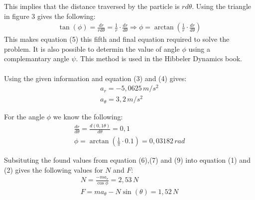 \documentclass[11pt, a4paper]{article}
\begin{document}
This implies that the distance traversed by the particle is $rd\theta$. Using the triangle in 
figure 3 gives the following:
\begin{gather}
    \tan(\phi) = \frac{dr}{rd\theta} = \frac{1}{r} \cdot \frac{dr}{d\theta} \Rightarrow
    \phi = \arctan \left( \frac{1}{r} \cdot \frac{dr}{d\theta} \right)
\end{gather}
This makes equation (5) this fifth and final equation required to solve the problem. It is also possible to
determin the value of angle $\phi$ using a complemantary angle $\psi$. This method is used in the Hibbeler Dynamics book.\\
\\
Using the given information and equation (3) and (4) gives:
\begin{gather}
    a_r = -5,0625\,m/s^2\\
    a_\theta = 3,2\,m/s^2
\end{gather}

For the angle $\phi$ we know the following:
\begin{gather}
    \frac{dr}{d\theta} = \frac{d(0,1\theta)}{d\theta} = 0,1 \\
    \phi = \arctan \left(\frac{1}{\pi} \cdot 0.1 \right) = 0,03182\,rad
\end{gather}

Subsituting the found values from equation (6),(7) and (9) into equation (1) and (2)
gives the following values for $N$ and $F$:
\begin{gather}
    N = \frac{-ma_r}{\cos{\phi}} = 2,53\,N\\
    F = ma_\theta - N\sin(\theta) = 1,52\,N
\end{gather}
\end{document}
